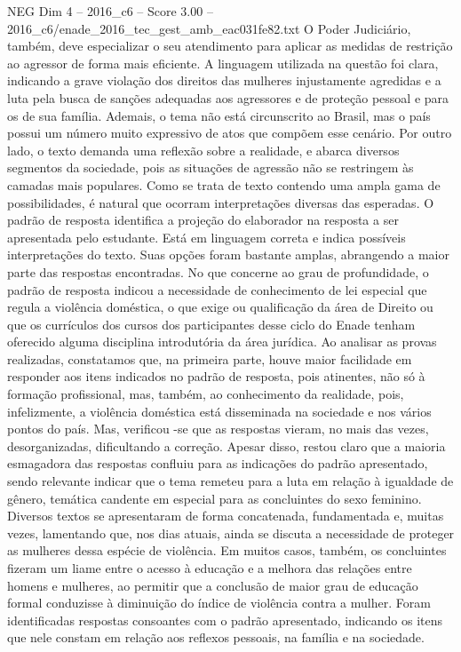\begin{textsample}{NEG Dim 4 – 2016\_c6 – Score 3.00 – 2016\_c6/enade\_2016\_tec\_gest\_amb\_eac031fe82.txt}
O Poder Judiciário, também, deve especializar o seu atendimento para aplicar as medidas de restrição ao agressor de forma mais eficiente.
A linguagem utilizada na questão foi clara, indicando a grave violação dos direitos das mulheres injustamente agredidas e a luta pela busca de sanções adequadas aos agressores e de proteção pessoal e para os de sua família.
Ademais, o tema não está circunscrito ao Brasil, mas o país possui um número muito expressivo de atos que compõem esse cenário.
Por outro lado, o texto demanda uma reflexão sobre a realidade, e abarca diversos segmentos da sociedade, pois as situações de agressão não se restringem às camadas mais populares.
Como se trata de texto contendo uma ampla gama de possibilidades, é natural que ocorram interpretações diversas das esperadas.
O padrão de resposta identifica a projeção do elaborador na resposta a ser apresentada pelo estudante.
Está em linguagem correta e indica possíveis interpretações do texto.
Suas opções foram bastante amplas, abrangendo a maior parte das respostas encontradas.
No que concerne ao grau de profundidade, o padrão de resposta indicou a necessidade de conhecimento de lei especial que regula a violência doméstica, o que exige ou qualificação da área de Direito ou que os currículos dos cursos dos participantes desse ciclo do Enade tenham oferecido alguma disciplina introdutória da área jurídica.
Ao analisar as provas realizadas, constatamos que, na primeira parte, houve maior facilidade em responder aos itens indicados no padrão de resposta, pois atinentes, não só à formação profissional, mas, também, ao conhecimento da realidade, pois, infelizmente, a violência doméstica está disseminada na sociedade e nos vários pontos do país.
Mas, verificou -se que as respostas vieram, no mais das vezes, desorganizadas, dificultando a correção.
Apesar disso, restou claro que a maioria esmagadora das respostas confluiu para as indicações do padrão apresentado, sendo relevante indicar que o tema remeteu para a luta em relação à igualdade de gênero, temática candente em especial para as concluintes do sexo feminino.
Diversos textos se apresentaram de forma concatenada, fundamentada e, muitas vezes, lamentando que, nos dias atuais, ainda se discuta a necessidade de proteger as mulheres dessa espécie de violência.
Em muitos casos, também, os concluintes fizeram um liame entre o acesso à educação e a melhora das relações entre homens e mulheres, ao permitir que a conclusão de maior grau de educação formal conduzisse à diminuição do índice de violência contra a mulher.
Foram identificadas respostas consoantes com o padrão apresentado, indicando os itens que nele constam em relação aos reflexos pessoais, na família e na sociedade.

\end{textsample}
